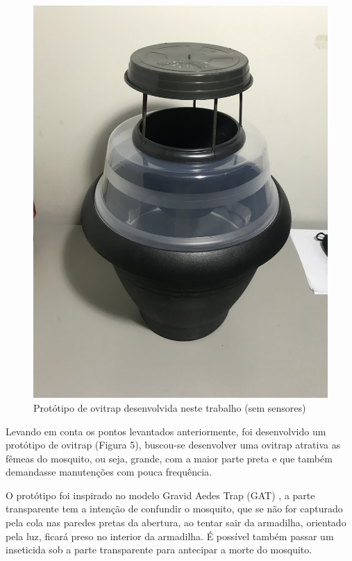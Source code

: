 \documentclass[
	12pt,				%
	openright,			%
	oneside,			%
	a4paper,			%
	chapter=TITLE,		%
	english,			%
	brazil				%
	]{abntex2}
\begin{document}
\begin{figure}[H]
\centering
\includegraphics[scale=0.09, angle=-90]{imagens/prototipo1_2.jpg}
\caption{Protótipo de ovitrap desenvolvida neste trabalho (sem sensores)}
\end{figure}

Levando em conta os pontos levantados anteriormente, foi desenvolvido um protótipo de ovitrap (Figura 5), buscou-se desenvolver 
uma ovitrap atrativa 
as fêmeas do mosquito, ou seja, grande, com a maior parte preta e que também demandasse manutenções com pouca frequência.

O protótipo foi inspirado no modelo Gravid Aedes Trap (GAT) \cite{ALVARO2014}, a parte transparente tem a intenção de confundir 
o mosquito, que se não for capturado
pela cola nas paredes pretas da abertura, ao tentar sair da armadilha, orientado pela luz, ficará preso no interior da armadilha. 
É possível também passar um inseticida sob a parte transparente para antecipar
a morte do mosquito.
\end{document}
